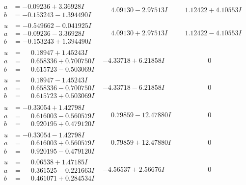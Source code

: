\documentclass[1p]{elsarticle_modified}
\theoremstyle{definition}
\begin{document}
$$\begin{array}{c|c|c}
\begin{aligned}
a &= -0.09236 + 3.36928 I \\
b &= -0.153243 - 1.394490 I\end{aligned}
 & \phantom{-}4.09130 - 2.97513 I & \phantom{-}1.12422 + 4.10553 I \\ \hline\begin{aligned}
u &= -0.549662 - 0.041925 I \\
a &= -0.09236 - 3.36928 I \\
b &= -0.153243 + 1.394490 I\end{aligned}
 & \phantom{-}4.09130 + 2.97513 I & \phantom{-}1.12422 - 4.10553 I \\ \hline\begin{aligned}
u &= \phantom{-}0.18947 + 1.45243 I \\
a &= \phantom{-}0.658336 + 0.700750 I \\
b &= \phantom{-}0.615723 - 0.503069 I\end{aligned}
 & -4.33718 + 6.21858 I & \phantom{-0.000000 } 0 \\ \hline\begin{aligned}
u &= \phantom{-}0.18947 - 1.45243 I \\
a &= \phantom{-}0.658336 - 0.700750 I \\
b &= \phantom{-}0.615723 + 0.503069 I\end{aligned}
 & -4.33718 - 6.21858 I & \phantom{-0.000000 } 0 \\ \hline\begin{aligned}
u &= -0.33054 + 1.42798 I \\
a &= \phantom{-}0.616003 - 0.560579 I \\
b &= \phantom{-}0.920195 + 0.479120 I\end{aligned}
 & \phantom{-}0.79859 - 12.47880 I & \phantom{-0.000000 } 0 \\ \hline\begin{aligned}
u &= -0.33054 - 1.42798 I \\
a &= \phantom{-}0.616003 + 0.560579 I \\
b &= \phantom{-}0.920195 - 0.479120 I\end{aligned}
 & \phantom{-}0.79859 + 12.47880 I & \phantom{-0.000000 } 0 \\ \hline\begin{aligned}
u &= \phantom{-}0.06538 + 1.47185 I \\
a &= \phantom{-}0.361525 - 0.221663 I \\
b &= \phantom{-}0.461071 + 0.284534 I\end{aligned}
 & -4.56537 + 2.56676 I & \phantom{-0.000000 } 0 \\ \hline\begin{aligned}

\end{aligned}
\end{array}$$
\end{document}
